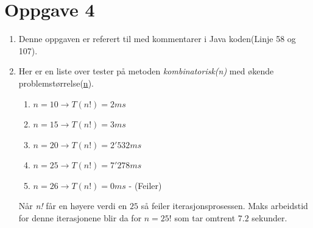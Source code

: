 \documentclass{article}
\begin{document}
\section*{Oppgave 4}
\begin{enumerate}[label=\alph*)]
\item Denne oppgaven er referert til med kommentarer i Java koden(Linje 58 og 107).
\item Her er en liste over tester på metoden \textit{kombinatorisk(n)} med økende problemstørrelse(\underline{n}).
\begin{enumerate}[label=-]
\item $n = 10 \to T(n!) = 2ms$
\item $n = 15 \to T(n!) = 3ms$
\item $n = 20 \to T(n!) = 2'532ms$
\item $n = 25 \to T(n!) = 7'278ms$
\item $n = 26 \to T(n!) = 0ms$ - (Feiler)
\end{enumerate}
Når \textit{n!} får en høyere verdi en $25$ så feiler iterasjonsprosessen. Maks arbeidstid for denne iterasjonene blir da for $n=25!$ som tar omtrent $7.2$ sekunder.
\end{enumerate}
\end{document}
